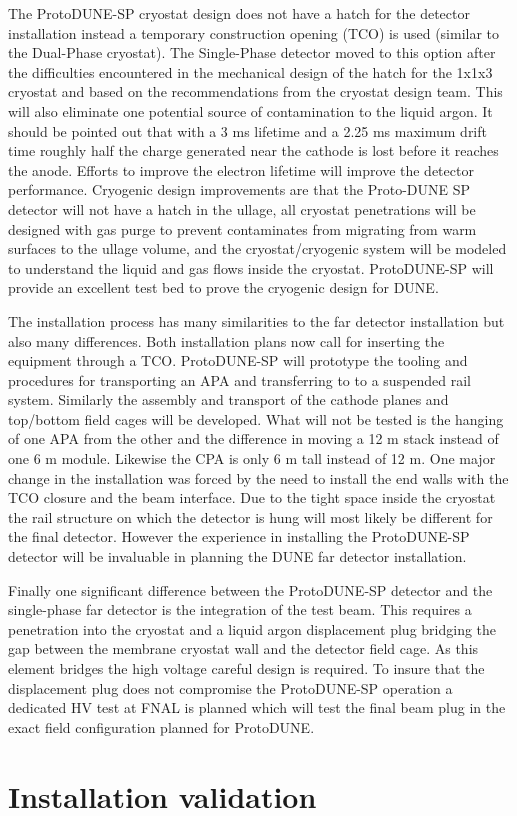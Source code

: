 The ProtoDUNE-SP cryostat design does not have a hatch for the detector installation instead a temporary construction opening (TCO) is used (similar to the Dual-Phase cryostat). The Single-Phase detector moved to this option after the difficulties encountered in the mechanical design of the hatch for the 1x1x3 cryostat and based on the recommendations from the cryostat design team.  This will also eliminate one potential source of contamination to the liquid argon. It should be pointed out that with a 3 ms lifetime and a 2.25 ms maximum drift time roughly half the charge generated near the cathode is lost before it reaches the anode. Efforts to improve the electron lifetime will improve the detector performance.  Cryogenic design improvements are that the Proto-DUNE SP detector will not have a hatch in the ullage, all cryostat penetrations will be designed with gas purge to prevent contaminates from migrating from warm surfaces to the ullage volume, and the cryostat/cryogenic system will be modeled to understand the liquid and gas flows inside the cryostat. ProtoDUNE-SP will provide an excellent test bed to prove the cryogenic design for DUNE. 

The installation process has many similarities to the far detector installation but also many differences. Both installation plans now call for inserting the equipment through a TCO. ProtoDUNE-SP will prototype the tooling and procedures for transporting an APA and transferring to to a suspended rail system. Similarly the assembly and transport of the cathode planes and top/bottom field cages will be developed. What will not be tested is the hanging of one APA from the other and the difference in moving a 12 m stack instead of one 6 m module. Likewise the CPA is only 6 m tall instead of 12 m. One major change in the installation was forced by the need to install the end walls with the TCO closure and the beam interface. Due to the tight space inside the cryostat the rail structure on which the detector is hung will most likely be different for the final detector. However the experience in installing the ProtoDUNE-SP detector will be invaluable in planning the DUNE far detector installation. 

Finally one significant difference between the ProtoDUNE-SP detector and the single-phase far detector is the integration of the test beam. This requires a penetration into the cryostat and a liquid argon displacement plug bridging the gap between the membrane cryostat wall and the detector field cage. As this element bridges the high voltage careful design is required. To insure that the displacement plug does not compromise the ProtoDUNE-SP operation a dedicated HV test at FNAL is planned which will test the final beam plug in the exact field configuration planned for ProtoDUNE.


\section{Installation validation}




